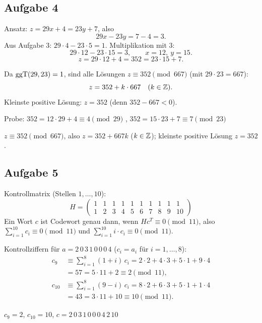 \subsection*{Aufgabe 4}
 Ansatz: $z = 29x + 4 = 23y + 7$, also
\[
29x - 23y = 7 - 4 = 3 .
\]
Aus Aufgabe 3: $29 \cdot 4 - 23 \cdot 5 = 1$. Multiplikation mit $3$:
\[
29 \cdot 12 - 23 \cdot 15 = 3, \qquad x = 12,\ y = 15 .
\]
\[
z = 29 \cdot 12 + 4 = 352 = 23 \cdot 15 + 7 .
\]

 Da $\operatorname{ggT}(29, 23) = 1$, sind alle Lösungen $z \equiv 352 \pmod{667}$ (mit $29 \cdot 23 = 667$):
\[
z = 352 + k \cdot 667 \quad (k \in \mathbb{Z}).
\]
Kleinste positive Lösung: $z = 352$ (denn $352 - 667 < 0$).

Probe: $352 = 12 \cdot 29 + 4 \equiv 4 \pmod{29}$ \checkmark, \quad $352 = 15 \cdot 23 + 7 \equiv 7 \pmod{23}$ \checkmark
\begin{ergebnis} $z \equiv 352 \pmod{667}$, also $z = 352 + 667k$ ($k \in \mathbb{Z}$); kleinste positive Lösung $z = 352$. \end{ergebnis}

\subsection*{Aufgabe 5}
 Kontrollmatrix (Stellen $1, \dots, 10$):
\[
H = \begin{pmatrix}
1 & 1 & 1 & 1 & 1 & 1 & 1 & 1 & 1 & 1\\
1 & 2 & 3 & 4 & 5 & 6 & 7 & 8 & 9 & 10
\end{pmatrix}
\]
Ein Wort $c$ ist Codewort genau dann, wenn $H c^T \equiv 0 \pmod{11}$, also
$\sum_{i=1}^{10} c_i \equiv 0 \pmod{11}$ und $\sum_{i=1}^{10} i \cdot c_i \equiv 0 \pmod{11}$.

 Kontrollziffern für $a = 2\,0\,3\,1\,0\,0\,0\,4$ ($c_i = a_i$ für $i = 1, \dots, 8$):
\begin{align*}
c_9 &\equiv \sum_{i=1}^{8} (1+i)\, c_i = 2 \cdot 2 + 4 \cdot 3 + 5 \cdot 1 + 9 \cdot 4\\ &= 57 = 5 \cdot 11 + 2 \equiv 2 \pmod{11},\\
c_{10} &\equiv \sum_{i=1}^{8} (9-i)\, c_i = 8 \cdot 2 + 6 \cdot 3 + 5 \cdot 1 + 1 \cdot 4\\ &= 43 = 3 \cdot 11 + 10 \equiv 10 \pmod{11}.
\end{align*}
\begin{ergebnis} $c_9 = 2$, $c_{10} = 10$, $c = 2\,0\,3\,1\,0\,0\,0\,4\,2\,10$ \end{ergebnis}

